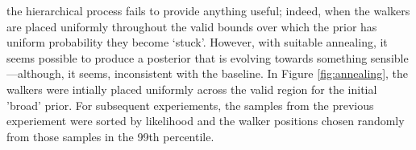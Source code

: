 \documentclass{tufte-handout}
\begin{document}
 the hierarchical process fails to
provide anything useful; indeed, when the walkers are placed uniformly
throughout the valid bounds over which the prior has uniform
probability they become `stuck'. However, with suitable annealing, it
seems possible to produce a posterior that is evolving towards
something sensible---although, it seems, inconsistent with the
baseline. In Figure \ref{fig:annealing}, the walkers were intially
placed uniformly across the valid region for the initial 'broad'
prior. For subsequent experiements, the samples from the previous
experiement were sorted by likelihood and the walker positions chosen
randomly from those samples in the 99th percentile.
\end{document}
